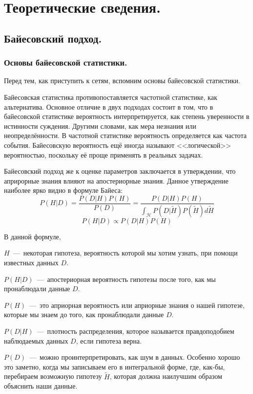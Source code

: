 \chapter{Теоретические сведения.}

\section{Байесовский подход.}

\subsection{Основы байесовской статистики.}

Перед тем, как приступить к сетям, вспомним основы байесовской статистики.

Байесовская статистика противопоставляется частотной статистике, как альтернатива. Основное отличие в двух подходах состоит в том,
 что в байесовской статистике вероятность интерпретируется, как степень уверенности в истинности суждения. Другими словами, как мера незнания или неопределённости.
 В частотной статистике вероятность определяется как частота события. Байесовскую вероятность ещё иногда называют <<логической>> вероятностью, поскольку
 её проще применять в реальных задачах.

Байесовский подход же к оценке параметров заключается в утверждении, что априрорные знания влияют на апостериорные знания. Данное утверждение наиболее ярко видно в формуле Байеса:
$$P(H | D) = \frac{P(D | H)P(H)}{P(D)} = \frac{P(D | H)P(H)}{\int_{\mathcal{H}} P(D | \widetilde{H})P(\widetilde{H}) d\widetilde{H}}$$
$$P(H | D) \propto P(D | H)P(H)$$

В данной формуле,

$H$~---~некоторая гипотеза, вероятность которой мы хотим узнать, при помощи известных данных $D$.

$P(H | D)$~---~апостериорная вероятность гипотезы после того, как мы пронаблюдали данные $D$.

$P(H)$~---~это априорная вероятность или априорные знания о нашей гипотезе, которые мы знаем до того, как пронаблюдали данные $D$.

$P(D | H)$~---~плотность распределения, которое называется правдоподобием наблюдаемых данных $D$, если гипотеза верна.

$P(D)$~---~можно проинтерпретировать, как шум в данных. Особенно хорошо это заметно, когда мы записываем его в интегральной форме, где, как-бы, перебираем
 возможную гипотезу $\widetilde{H}$, которая должна наилучшим образом объяснить наши данные.

